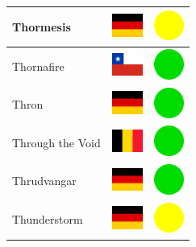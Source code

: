 \documentclass[12pt, a4paper, twoside]{report}
\begin{document}
\begin{center}
\begin{longtable}{|p{5cm}|p{2cm}|p{2cm}|}
 Thormesis                                                  & \includegraphics[width=1cm]{../4x3/de} &   \includegraphics[width=1cm]{../likes/m} \\ \hline
 Thornafire                                                 & \includegraphics[width=1cm]{../4x3/cl} &   \includegraphics[width=1cm]{../likes/y} \\ \hline
 Thron                                                      & \includegraphics[width=1cm]{../4x3/de} &   \includegraphics[width=1cm]{../likes/y} \\ \hline
 Through the Void                                           & \includegraphics[width=1cm]{../4x3/be} &   \includegraphics[width=1cm]{../likes/y} \\ \hline
 Thrudvangar                                                & \includegraphics[width=1cm]{../4x3/de} &   \includegraphics[width=1cm]{../likes/y} \\ \hline
 Thunderstorm                                               & \includegraphics[width=1cm]{../4x3/de} &   \includegraphics[width=1cm]{../likes/m} \\ \hline

\end{longtable}
\end{center}
\end{document}
